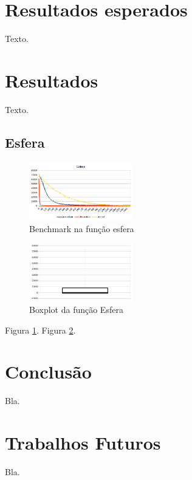 \documentclass[journal]{IEEEtran}
\begin{document}
\section{Resultados esperados}
Texto.%

\section{Resultados}
Texto.%

\subsection{Esfera}
\begin{figure}
	\centering
	\includegraphics[width=0.4\textwidth]{img/esf}
	\caption{Benchmark na função esfera}
	\label{fig:esfera}
\end{figure}
\begin{figure}
	\centering
	\includegraphics[width=0.4\textwidth]{img/block_esf}
	\caption{Boxplot da função Esfera}
	\label{fig:besf}
\end{figure}
Figura \ref{fig:esfera}. Figura \ref{fig:besf}.


\section{Conclusão}
Bla.%

\section{Trabalhos Futuros}
Bla.%




\end{document}
